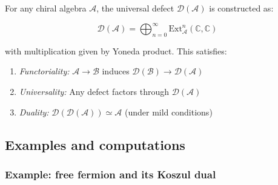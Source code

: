 \begin{theorem}\label{thm:universal-defect-construction}
For any chiral algebra $\mathcal{A}$, the universal defect $\mathcal{D}(\mathcal{A})$ is constructed as:

\[\mathcal{D}(\mathcal{A}) = \bigoplus_{n=0}^\infty \text{Ext}^n_{\mathcal{A}}(\mathbb{C}, \mathbb{C})\]

with multiplication given by Yoneda product. This satisfies:
\begin{enumerate}
\item \emph{Functoriality:} $\mathcal{A} \to \mathcal{B}$ induces $\mathcal{D}(\mathcal{B}) \to \mathcal{D}(\mathcal{A})$
\item \emph{Universality:} Any defect factors through $\mathcal{D}(\mathcal{A})$
\item \emph{Duality:} $\mathcal{D}(\mathcal{D}(\mathcal{A})) \simeq \mathcal{A}$ (under mild conditions)
\end{enumerate}
\end{theorem}

\subsection{Examples and computations}

\subsubsection{Example: free fermion and its Koszul dual}

